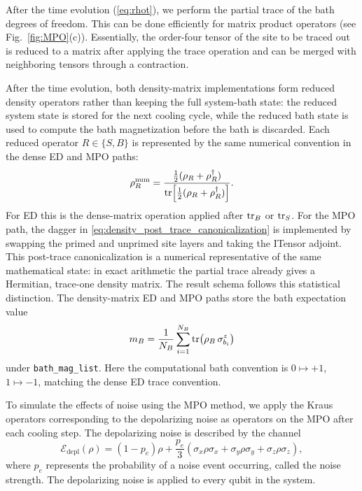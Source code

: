 \documentclass[aps,pra,twocolumn,superscriptaddress,nolongbibliography,nobalancelastpage,10pt]{revtex4-2}
\begin{document}
After the time evolution (\ref{eq:rhot}), we perform the partial trace of the bath degrees of freedom. This can be done efficiently for matrix product operators (see Fig.~\ref{fig:MPO}(c)). Essentially, the order-four tensor of the site to be traced out is reduced to a matrix after applying the trace operation and can be merged with neighboring tensors through a contraction.

After the time evolution, both density-matrix implementations form reduced
density operators rather than keeping the full system-bath state: the reduced
system state is stored for the next cooling cycle, while the reduced bath state
is used to compute the bath magnetization before the bath is discarded.  Each
reduced operator \(R\in\{S,B\}\) is represented by the same numerical
convention in the dense ED and MPO paths:
\begin{equation}
	\rho_R^{\mathrm{num}}
	=
	\frac{\frac12(\rho_R+\rho_R^\dagger)}
	     {\operatorname{tr}\!\left[\frac12(\rho_R+\rho_R^\dagger)\right]} .
	\label{eq:density_post_trace_canonicalization}
\end{equation}
For ED this is the dense-matrix operation applied after \(\operatorname{tr}_B\) or
\(\operatorname{tr}_S\).  For the MPO path, the dagger in
\cref{eq:density_post_trace_canonicalization} is implemented by swapping the
primed and unprimed site layers and taking the ITensor adjoint.  This
post-trace canonicalization is a numerical representative of the same
mathematical state: in exact arithmetic the partial trace already gives a
Hermitian, trace-one density matrix.
The result schema follows this statistical distinction.  The density-matrix ED
and MPO paths store the bath expectation value
\begin{equation}
	m_B=\frac{1}{N_B}\sum_{i=1}^{N_B}
	\operatorname{tr}\!\left(\rho_B\,\sigma^z_{b_i}\right)
\end{equation}
under \texttt{bath\_mag\_list}.  Here the computational bath convention is
\(0\mapsto +1\), \(1\mapsto -1\), matching the dense ED trace convention.

To simulate the effects of noise using the MPO method, we apply the Kraus operators corresponding to the depolarizing noise as operators on the MPO after each cooling step. The depolarizing noise is described by the channel
\begin{equation}
	\mathcal{E}_\text{depl}(\rho) = (1-p_e)\rho + \frac{p_e}{3}(\sigma_x\rho \sigma_x + \sigma_y\rho \sigma_y + \sigma_z\rho\sigma_z),
	\label{eq:depolarizing}
\end{equation}
where $p_e$ represents the probability of a noise event occurring, called the noise strength. The depolarizing noise is applied to every qubit in the system.
\end{document}
